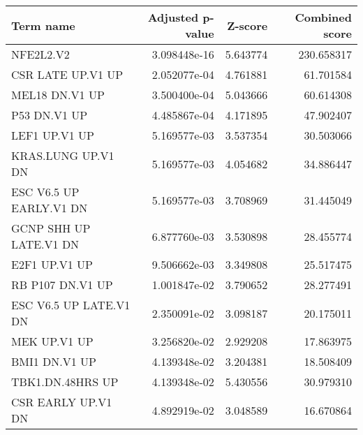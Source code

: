 \begin{tabular}{lrrr}
\toprule
              Term name &  Adjusted p-value &  Z-score &  Combined score \\
\midrule
              NFE2L2.V2 &      3.098448e-16 & 5.643774 &      230.658317 \\
      CSR LATE UP.V1 UP &      2.052077e-04 & 4.761881 &       61.701584 \\
         MEL18 DN.V1 UP &      3.500400e-04 & 5.043666 &       60.614308 \\
           P53 DN.V1 UP &      4.485867e-04 & 4.171895 &       47.902407 \\
          LEF1 UP.V1 UP &      5.169577e-03 & 3.537354 &       30.503066 \\
     KRAS.LUNG UP.V1 DN &      5.169577e-03 & 4.054682 &       34.886447 \\
ESC V6.5 UP EARLY.V1 DN &      5.169577e-03 & 3.708969 &       31.445049 \\
 GCNP SHH UP LATE.V1 DN &      6.877760e-03 & 3.530898 &       28.455774 \\
          E2F1 UP.V1 UP &      9.506662e-03 & 3.349808 &       25.517475 \\
       RB P107 DN.V1 UP &      1.001847e-02 & 3.790652 &       28.277491 \\
 ESC V6.5 UP LATE.V1 DN &      2.350091e-02 & 3.098187 &       20.175011 \\
           MEK UP.V1 UP &      3.256820e-02 & 2.929208 &       17.863975 \\
          BMI1 DN.V1 UP &      4.139348e-02 & 3.204381 &       18.508409 \\
       TBK1.DN.48HRS UP &      4.139348e-02 & 5.430556 &       30.979310 \\
     CSR EARLY UP.V1 DN &      4.892919e-02 & 3.048589 &       16.670864 \\
\bottomrule
\end{tabular}
